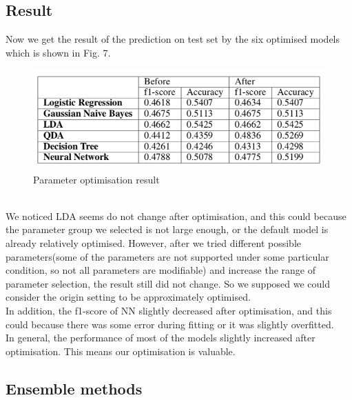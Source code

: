 \documentclass{article}
\begin{document}
\subsection{Result}
Now we get the result of the prediction on test set by the six optimised models which is shown in Fig. 7.
\begin{figure}[ht]
\centering
\includegraphics[scale=0.7]{graphs/result_table.png}
\caption{Parameter optimisation result}
\label{fig:confusion_matrix}
\end{figure}\\
We noticed LDA seems do not change after optimisation, and this could because the parameter group we selected is not large enough, or the default model is already relatively optimised. However, after we tried different possible parameters(some of the parameters are not supported under some particular condition, so not all parameters are modifiable) and increase the range of parameter selection, the result still did not change. So we supposed we could consider the origin setting to be approximately optimised.\\
In addition, the f1-score of NN slightly decreased  after optimisation, and this could because there was some error during fitting or it was slightly overfitted. \\
In general, the performance of most of the models slightly increased after optimisation. This means our optimisation is valuable. 

\subsection{Ensemble methods}
\end{document}
